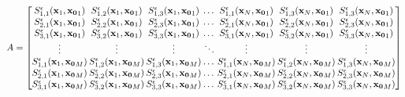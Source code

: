 \begin{equation*}
A = 
\begingroup
\setlength\arraycolsep{1pt}
\begin{bmatrix}
S^{\epsilon}_{1,1}(\mathbf{x}_1,\mathbf{x_{0}}_1) & S^{\epsilon}_{1,2}(\mathbf{x}_1,\mathbf{x_{0}}_1) & S^{\epsilon}_{1,3}(\mathbf{x}_1,\mathbf{x_{0}}_1) & \dots & S^{\epsilon}_{1,1}(\mathbf{x}_N,\mathbf{x_{0}}_1) & S^{\epsilon}_{1,3}(\mathbf{x}_N,\mathbf{x_{0}}_1) & S^{\epsilon}_{1,3}(\mathbf{x}_N,\mathbf{x_{0}}_1)\\
S^{\epsilon}_{2,1}(\mathbf{x}_1,\mathbf{x_{0}}_1) & S^{\epsilon}_{2,2}(\mathbf{x}_1,\mathbf{x_{0}}_1) & S^{\epsilon}_{2,3}(\mathbf{x}_1,\mathbf{x_{0}}_1) & \dots & S^{\epsilon}_{2,1}(\mathbf{x}_N,\mathbf{x_{0}}_1) & S^{\epsilon}_{2,2}(\mathbf{x}_N,\mathbf{x_{0}}_1) & S^{\epsilon}_{2,3}(\mathbf{x}_N,\mathbf{x_{0}}_1)\\
S^{\epsilon}_{3,1}(\mathbf{x}_1,\mathbf{x_{0}}_1) & S^{\epsilon}_{3,2}(\mathbf{x}_1,\mathbf{x_{0}}_1) & S^{\epsilon}_{3,3}(\mathbf{x}_1,\mathbf{x_{0}}_1) & \dots & S^{\epsilon}_{3,1}(\mathbf{x}_N,\mathbf{x_{0}}_1) & S^{\epsilon}_{3,2}(\mathbf{x}_N,\mathbf{x_{0}}_1) & S^{\epsilon}_{3,3}(\mathbf{x}_N,\mathbf{x_{0}}_1)\\
\vdots & \vdots & \vdots & \ddots & \vdots & \vdots & \vdots \\
S^{\epsilon}_{1,1}(\mathbf{x}_1,\mathbf{x_{0}}_M) & S^{\epsilon}_{1,2}(\mathbf{x}_1,\mathbf{x_{0}}_M) & S^{\epsilon}_{1,3}(\mathbf{x}_1,\mathbf{x_{0}}_M) & \dots & S^{\epsilon}_{1,1}(\mathbf{x}_N,\mathbf{x_{0}}_M) & S^{\epsilon}_{1,2}(\mathbf{x}_N,\mathbf{x_{0}}_M) & S^{\epsilon}_{1,3}(\mathbf{x}_N,\mathbf{x_{0}}_M)  \\
S^{\epsilon}_{2,1}(\mathbf{x}_1,\mathbf{x_{0}}_M) & S^{\epsilon}_{2,2}(\mathbf{x}_1,\mathbf{x_{0}}_M) & S^{\epsilon}_{2,3}(\mathbf{x}_1,\mathbf{x_{0}}_M) & \dots & S^{\epsilon}_{2,1}(\mathbf{x}_N,\mathbf{x_{0}}_M) & S^{\epsilon}_{2,2}(\mathbf{x}_N,\mathbf{x_{0}}_M) & S^{\epsilon}_{2,3}(\mathbf{x}_N,\mathbf{x_{0}}_M) \\
S^{\epsilon}_{3,1}(\mathbf{x}_1,\mathbf{x_{0}}_M) & S^{\epsilon}_{3,2}(\mathbf{x}_1,\mathbf{x_{0}}_M) & S^{\epsilon}_{3,3}(\mathbf{x}_1,\mathbf{x_{0}}_M) & \dots & S^{\epsilon}_{3,1}(\mathbf{x}_N,\mathbf{x_{0}}_M) & S^{\epsilon}_{3,2}(\mathbf{x}_N,\mathbf{x_{0}}_M) & S^{\epsilon}_{3,3}(\mathbf{x}_N,\mathbf{x_{0}}_M) \\
\end{bmatrix}
\endgroup
\end{equation*}
\normalsize

